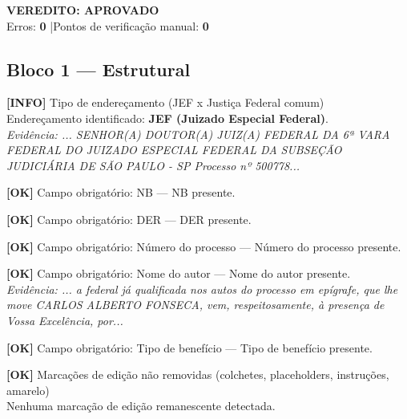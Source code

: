 \documentclass[12pt,a4paper]{article}
\newcommand{\statusOK}[1]{\textcolor{corOK}{\textbf{[OK]}} #1}
\newcommand{\statusINFO}[1]{\textcolor{corINFO}{\textbf{[INFO]}} #1}
\begin{document}
\vspace{0.5em}

\noindent\colorbox{corFundoAprovado}{%
  \begin{minipage}{\dimexpr\linewidth-2\fboxsep}
    \centering
    \vspace{0.3em}
    {\large \textcolor{corOK}{\textbf{VEREDITO: APROVADO}}}\\
    Erros: \textbf{0} \quad|\quad Pontos de verificação manual: \textbf{0}
    \vspace{0.3em}
  \end{minipage}%
}

\vspace{1em}


\subsection{Bloco 1 --- Estrutural}

\statusINFO{Tipo de endereçamento (JEF x Justiça Federal comum)}\\
Endereçamento identificado: \textbf{JEF (Juizado Especial Federal)}.\\
\textit{Evidência: ... SENHOR(A) DOUTOR(A) JUIZ(A) FEDERAL DA 6ª VARA FEDERAL DO JUIZADO ESPECIAL FEDERAL DA SUBSEÇÃO JUDICIÁRIA DE SÃO PAULO - SP Processo nº 500778...}

\medskip
\statusOK{Campo obrigatório: NB} --- NB presente.

\medskip
\statusOK{Campo obrigatório: DER} --- DER presente.

\medskip
\statusOK{Campo obrigatório: Número do processo} --- Número do processo presente.

\medskip
\statusOK{Campo obrigatório: Nome do autor} --- Nome do autor presente.\\
\textit{Evidência: ... a federal já qualificada nos autos do processo em epígrafe, que lhe move CARLOS ALBERTO FONSECA, vem, respeitosamente, à presença de Vossa Excelência, por...}

\medskip
\statusOK{Campo obrigatório: Tipo de benefício} --- Tipo de benefício presente.

\medskip
\statusOK{Marcações de edição não removidas (colchetes, placeholders, instruções, amarelo)}\\
Nenhuma marcação de edição remanescente detectada.
\end{document}
